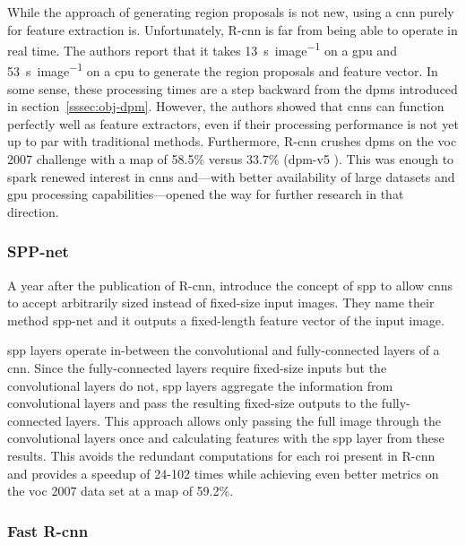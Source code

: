 \documentclass[draft,final]{vutinfth} %
\begin{document}
While the approach of generating region proposals is not new, using a
\gls{cnn} purely for feature extraction is. Unfortunately, R-\gls{cnn}
is far from being able to operate in real time. The authors report
that it takes \qty{13}{\s\per image} on a \gls{gpu} and
\qty{53}{\s\per image} on a \gls{cpu} to generate the region proposals
and feature vector. In some sense, these processing times are a step
backward from the \glspl{dpm} introduced in
section~\ref{sssec:obj-dpm}. However, the authors showed that
\glspl{cnn} can function perfectly well as feature extractors, even if
their processing performance is not yet up to par with traditional
methods. Furthermore, R-\gls{cnn} crushes \glspl{dpm} on the \gls{voc}
2007 challenge with a \gls{map} of 58.5\% \cite{girshick2014} versus
33.7\% (\gls{dpm}-v5 \cite{girshick,felzenszwalb2010}). This was
enough to spark renewed interest in \glspl{cnn} and—with better
availability of large datasets and \gls{gpu} processing
capabilities—opened the way for further research in that direction.

\subsubsection{SPP-net}
\label{sssec:theory-spp-net}

A year after the publication of R-\gls{cnn}, \textcite{he2015}
introduce the concept of \gls{spp} to allow \glspl{cnn} to accept
arbitrarily sized instead of fixed-size input images. They name their
method \gls{spp}-net and it outputs a fixed-length feature vector of
the input image.

\gls{spp} layers operate in-between the convolutional and
fully-connected layers of a \gls{cnn}. Since the fully-connected
layers require fixed-size inputs but the convolutional layers do not,
\gls{spp} layers aggregate the information from convolutional layers
and pass the resulting fixed-size outputs to the fully-connected
layers. This approach allows only passing the full image through the
convolutional layers once and calculating features with the \gls{spp}
layer from these results. This avoids the redundant computations for
each \gls{roi} present in R-\gls{cnn} and provides a speedup of 24-102
times while achieving even better metrics on the \gls{voc} 2007 data
set at a \gls{map} of 59.2\%.

\subsubsection{Fast R-\gls{cnn}}
\label{sssec:theory-fast-rcnn}
\end{document}
